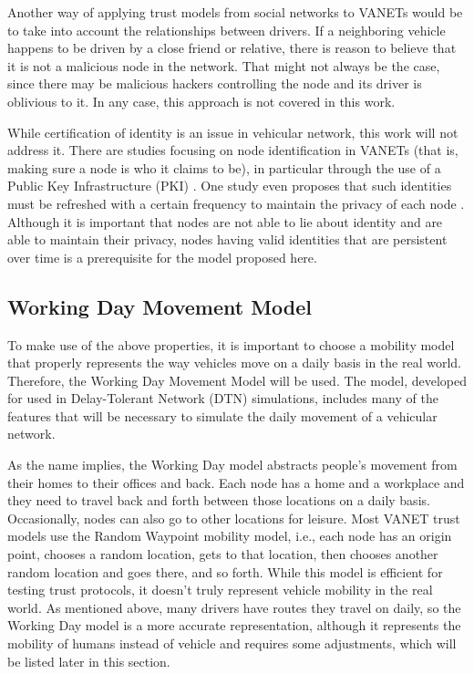 \documentclass{article}
\begin{document}
Another way of applying trust models from social networks to VANETs would be to take into account the relationships between drivers.
If a neighboring vehicle happens to be driven by a close friend or relative, there is reason to believe that it is not a malicious node in the network.
That might not always be the case, since there may be malicious hackers controlling the node and its driver is oblivious to it.
In any case, this approach is not covered in this work.

While certification of identity is an issue in vehicular network, this work will not address it.
There are studies focusing on node identification in VANETs (that is, making sure a node is who it claims to be), in particular through the use of a Public Key Infrastructure (PKI) \cite{wasef2010complementing} 
\cite{kumar2015intelligent}.
One study even proposes that such identities must be refreshed with a certain frequency to maintain the privacy of each node \cite{golle2004detecting}.
Although it is important that nodes are not able to lie about identity and are able to maintain their privacy, nodes having valid identities that are persistent over time is a prerequisite for the model proposed here.

\subsection{Working Day Movement Model}

To make use of the above properties, it is important to choose a mobility model that properly represents the way vehicles move on a daily basis in the real world.
Therefore, the Working Day Movement Model \cite{ekman2008working} will be used.
The model, developed for used in Delay-Tolerant Network (DTN) simulations, includes many of the features that will be necessary to simulate the daily movement of a vehicular network.

As the name implies, the Working Day model abstracts people's movement from their homes to their offices and back.
Each node has a home and a workplace and they need to travel back and forth between those locations on a daily basis.
Occasionally, nodes can also go to other locations for leisure.
Most VANET trust models use the Random Waypoint mobility model, i.e., each node has an origin point, chooses a random location, gets to that location, then chooses another random location and goes there, and so forth.
While this model is efficient for testing trust protocols, it doesn't truly represent vehicle mobility in the real world.
As mentioned above, many drivers have routes they travel on daily, so the Working Day model is a more accurate representation, although it represents the mobility of humans instead of vehicle and requires some adjustments, which will be listed later in this section.
\end{document}
